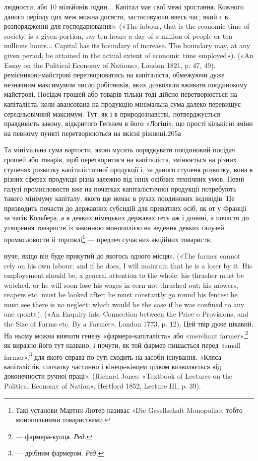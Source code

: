 людности, або 10 мільйонів годин... Капітал має свої межі зростання.
Кожного даного періоду цих меж можна досягти, застосовуючи ввесь
час, який є в розпорядженні для господарювання». («The labour, that
is the economic time of society, is a given portion, say ten hours a day of
a million of people or ten millions hours... Capital has its boundary of increase.
The boundary may, at any given period, be attained in the actual
extent of economic time employed»). («An Essay on the Political Economy
of Nations», London 1821, p. 47, 49).
ремісникові-майстрові перетворюватись на капіталіста, обмежуючи
дуже незначним максимумом число робітників, яких дозволяли
вживати поодинокому майстрові. Посідач грошей або товарів
тільки тоді дійсно перетворюється на капіталіста, коли авансована
на продукцію мінімальна сума далеко перевищує середньовічний
максимум. Тут, як і в природознавстві, потверджується
правдивість закону, відкритого Геґелем в його «Логіці»,
що прості кількісні зміни на певному пункті перетворюються
на якісні ріжниці.205а

Та мінімальна сума вартости, якою мусить порядкувати поодинокий
посідач грошей або товарів, щоб перетворитися на капіталіста,
змінюється на різних ступенях розвитку капіталістичної
продукції і, за даного ступеня розвитку, вона в різних сферах
продукції різна залежно від їхніх осібних технічних умов. Певні
галузі промисловости вже на початках капіталістичної продукції
потребують такого мінімуму капіталу, якого ще немає в руках
поодиноких індивідів. Це призводить почасти до державних субсидій
для приватних осіб, як от у Франції за часів Кольбера, а в
деяких німецьких державах геть аж і донині, а почасти до утворення
товариств із законною монополією на ведення деяких
галузей промисловости й торговлі\footnote{
Такі установи Мартин Лютер називає «Die Gesellschaft Monopolia»,
тобто монопольними товариствами.
} — предтеч сучасних акційних
товариств.

нуче, якщо він буде прикутий до якогось одного місця». («The farmer
cannot rely on his own labour; and if he does, I will maintain that he is
a loser by it. His employement should be, a general attention to the whole:
his thrasher must be watched, or he will soon lose his wages in corn not
thrashed out; his mowers, reapers etc. must be looked after; he must constantly
go round his fences: he must see there is no neglect; which would
be the case if he was confined to any one spont»). («An Enquiry into Connection
between the Price o Provisions, and the Size of Farms etc. By a
Farmer», London 1773, p. 12). Цей твір дуже цікавий. На ньому можна
вивчати генезу «фармера-капіталіста» або «merchant farmer»,\footnote*{
— фармера-купця. \emph{Ред.}
} як виразно
його тут названо, і почути, як той фармер пишається перед «small
farmer»,\footnote*{
— дрібним фармером. \emph{Ред.}
} для якого справа по суті сходить на засоби існування. «Кляса
капіталістів, спочатку частинно і кінець-кінцем цілком визволяється
від доконечности ручної праці». (Richard Jones: «Textbook of Lectures on
the Political Economy of Nation», Hertford 1852, Lecture III, p. 39).

